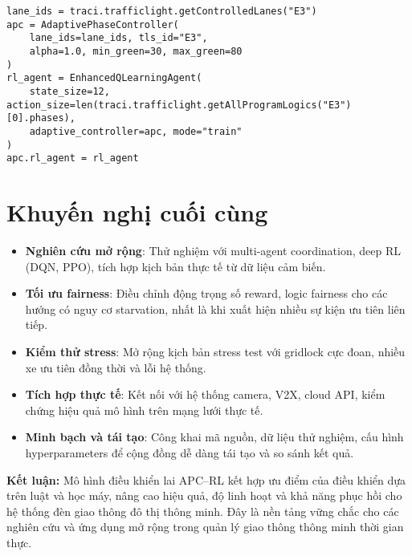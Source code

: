 \begin{lstlisting}[style=py,caption={Ví dụ đoạn mã khởi tạo APC và RL agent trên một nút giao}]
lane_ids = traci.trafficlight.getControlledLanes("E3")
apc = AdaptivePhaseController(
    lane_ids=lane_ids, tls_id="E3",
    alpha=1.0, min_green=30, max_green=80
)
rl_agent = EnhancedQLearningAgent(
    state_size=12, action_size=len(traci.trafficlight.getAllProgramLogics("E3")[0].phases),
    adaptive_controller=apc, mode="train"
)
apc.rl_agent = rl_agent
\end{lstlisting}

\section{Khuyến nghị cuối cùng}

\begin{itemize}
    \item \textbf{Nghiên cứu mở rộng}: Thử nghiệm với multi-agent coordination, deep RL (DQN, PPO), tích hợp kịch bản thực tế từ dữ liệu cảm biến.
    \item \textbf{Tối ưu fairness}: Điều chỉnh động trọng số reward, logic fairness cho các hướng có nguy cơ starvation, nhất là khi xuất hiện nhiều sự kiện ưu tiên liên tiếp.
    \item \textbf{Kiểm thử stress}: Mở rộng kịch bản stress test với gridlock cực đoan, nhiều xe ưu tiên đồng thời và lỗi hệ thống.
    \item \textbf{Tích hợp thực tế}: Kết nối với hệ thống camera, V2X, cloud API, kiểm chứng hiệu quả mô hình trên mạng lưới thực tế.
    \item \textbf{Minh bạch và tái tạo}: Công khai mã nguồn, dữ liệu thử nghiệm, cấu hình hyperparameters để cộng đồng dễ dàng tái tạo và so sánh kết quả.
\end{itemize}

\vspace{0.5cm}

\noindent\textbf{Kết luận:} Mô hình điều khiển lai APC–RL kết hợp ưu điểm của điều khiển dựa trên luật và học máy, nâng cao hiệu quả, độ linh hoạt và khả năng phục hồi cho hệ thống đèn giao thông đô thị thông minh. Đây là nền tảng vững chắc cho các nghiên cứu và ứng dụng mở rộng trong quản lý giao thông thông minh thời gian thực.
